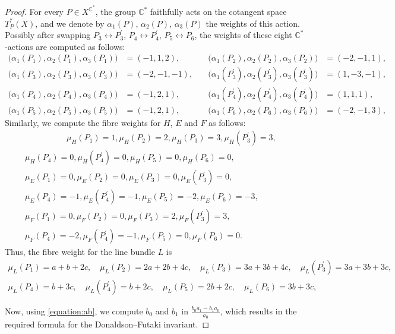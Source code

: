 \documentclass[12pt]{amsart}
\theoremstyle{definition}
\theoremstyle{remark}
\newcommand{\C}{\mathbb{C}}
\begin{document}
\begin{proof}
For every $P\in X^{\C^*}$, the group $\mathbb{C}^*$ faithfully acts on the cotangent space $T_P^*(X)$,
and we denote by $\alpha_1(P)$, $\alpha_2(P)$, $\alpha_3(P)$ the weights of this action.
Possibly after swapping $P_3\leftrightarrow P_3^\prime$, $P_4\leftrightarrow P_4^\prime$, $P_5\leftrightarrow P_6$, 
the weights of these eight $\mathbb{C}^*$-actions are computed as follows:
\begin{align*}
\big(\alpha_1(P_1),\alpha_2(P_1),\alpha_3(P_1)\big)&=(-1,1,2),&\quad
\big(\alpha_1(P_2),\alpha_2(P_2),\alpha_3(P_2)\big)&=(-2,-1,1),&\quad\\
\big(\alpha_1(P_3),\alpha_2(P_3),\alpha_3(P_3)\big)&=(-2,-1,-1),&\quad
\big(\alpha_1(P_3^\prime),\alpha_2(P_3^\prime),\alpha_3(P_3^\prime)\big)&=(1,-3,-1),\\
\big(\alpha_1(P_4),\alpha_2(P_4),\alpha_3(P_4)\big)&=(-1,2,1),&\quad
\big(\alpha_1(P_4^\prime),\alpha_2(P_4^\prime),\alpha_3(P_4^\prime)\big)&=(1,1,1),\\
\big(\alpha_1(P_5),\alpha_2(P_5),\alpha_3(P_5)\big)&=(-1,2,1),&\quad
\big(\alpha_1(P_6),\alpha_2(P_6),\alpha_3(P_6)\big)&=(-2,-1,3),&\quad
\end{align*}
Similarly, we compute the fibre weights for  $H$, $E$ and $F$ as follows:
\begin{multline*}
\quad \quad \quad \quad \quad \mu_H(P_1)=1, \mu_H(P_2)=2, \mu_H(P_3)=3, \mu_H(P_3^\prime)=3, \\
\mu_H(P_4)=0, \mu_H(P_4^\prime)=0, \mu_H(P_5)=0, \mu_H(P_6)=0,\quad \\
\mu_E(P_1)=0, \mu_E(P_2)=0, \mu_E(P_3)=0, \mu_E(P_3^\prime)=0, \\
\mu_E(P_4)=-1, \mu_E(P_4^\prime)=-1, \mu_E(P_5)=-2, \mu_E(P_6)=-3, \\
\mu_F(P_1)=0, \mu_F(P_2)=0, \mu_F(P_3)=2, \mu_F(P_3^\prime)=3, \\
\mu_F(P_4)=-2, \mu_F(P_4^\prime)=-1,  \mu_F(P_5)=0, \mu_F(P_6)=0.\quad \quad \quad \quad \quad
\end{multline*}
Thus, the fibre weight for the line bundle $L$ is
\begin{multline*}
\mu_L(P_1)=a+b+2c,\quad
\mu_L(P_2)=2a+2b+4c,\quad
\mu_L(P_3)=3a+3b+4c,\quad
\mu_L(P_3^\prime)=3a+3b+3c,\quad\\
\mu_L(P_4)=b+3c,\quad
\mu_L(P_4^\prime)=b+2c,\quad
\mu_L(P_5)=2b+2c,\quad
\mu_L(P_6)=3b+3c,\quad
\end{multline*}

Now, using \eqref{equation:ab}, we compute $b_0$ and $b_1$ in $\frac{b_0a_1-b_1a_0}{a_0}$, which results
in the required formula for the Donaldson--Futaki invariant.
\end{proof}
\end{document}
